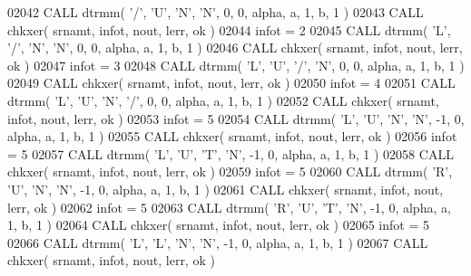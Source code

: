 \begin{DoxyCode}
02042       \textcolor{keyword}{CALL }dtrmm( \textcolor{stringliteral}{'/'}, \textcolor{stringliteral}{'U'}, \textcolor{stringliteral}{'N'}, \textcolor{stringliteral}{'N'}, 0, 0, alpha, a, 1, b, 1 )
02043       \textcolor{keyword}{CALL }chkxer( srnamt, infot, nout, lerr, ok )
02044       infot = 2
02045       \textcolor{keyword}{CALL }dtrmm( \textcolor{stringliteral}{'L'}, \textcolor{stringliteral}{'/'}, \textcolor{stringliteral}{'N'}, \textcolor{stringliteral}{'N'}, 0, 0, alpha, a, 1, b, 1 )
02046       \textcolor{keyword}{CALL }chkxer( srnamt, infot, nout, lerr, ok )
02047       infot = 3
02048       \textcolor{keyword}{CALL }dtrmm( \textcolor{stringliteral}{'L'}, \textcolor{stringliteral}{'U'}, \textcolor{stringliteral}{'/'}, \textcolor{stringliteral}{'N'}, 0, 0, alpha, a, 1, b, 1 )
02049       \textcolor{keyword}{CALL }chkxer( srnamt, infot, nout, lerr, ok )
02050       infot = 4
02051       \textcolor{keyword}{CALL }dtrmm( \textcolor{stringliteral}{'L'}, \textcolor{stringliteral}{'U'}, \textcolor{stringliteral}{'N'}, \textcolor{stringliteral}{'/'}, 0, 0, alpha, a, 1, b, 1 )
02052       \textcolor{keyword}{CALL }chkxer( srnamt, infot, nout, lerr, ok )
02053       infot = 5
02054       \textcolor{keyword}{CALL }dtrmm( \textcolor{stringliteral}{'L'}, \textcolor{stringliteral}{'U'}, \textcolor{stringliteral}{'N'}, \textcolor{stringliteral}{'N'}, -1, 0, alpha, a, 1, b, 1 )
02055       \textcolor{keyword}{CALL }chkxer( srnamt, infot, nout, lerr, ok )
02056       infot = 5
02057       \textcolor{keyword}{CALL }dtrmm( \textcolor{stringliteral}{'L'}, \textcolor{stringliteral}{'U'}, \textcolor{stringliteral}{'T'}, \textcolor{stringliteral}{'N'}, -1, 0, alpha, a, 1, b, 1 )
02058       \textcolor{keyword}{CALL }chkxer( srnamt, infot, nout, lerr, ok )
02059       infot = 5
02060       \textcolor{keyword}{CALL }dtrmm( \textcolor{stringliteral}{'R'}, \textcolor{stringliteral}{'U'}, \textcolor{stringliteral}{'N'}, \textcolor{stringliteral}{'N'}, -1, 0, alpha, a, 1, b, 1 )
02061       \textcolor{keyword}{CALL }chkxer( srnamt, infot, nout, lerr, ok )
02062       infot = 5
02063       \textcolor{keyword}{CALL }dtrmm( \textcolor{stringliteral}{'R'}, \textcolor{stringliteral}{'U'}, \textcolor{stringliteral}{'T'}, \textcolor{stringliteral}{'N'}, -1, 0, alpha, a, 1, b, 1 )
02064       \textcolor{keyword}{CALL }chkxer( srnamt, infot, nout, lerr, ok )
02065       infot = 5
02066       \textcolor{keyword}{CALL }dtrmm( \textcolor{stringliteral}{'L'}, \textcolor{stringliteral}{'L'}, \textcolor{stringliteral}{'N'}, \textcolor{stringliteral}{'N'}, -1, 0, alpha, a, 1, b, 1 )
02067       \textcolor{keyword}{CALL }chkxer( srnamt, infot, nout, lerr, ok )

\end{DoxyCode}
